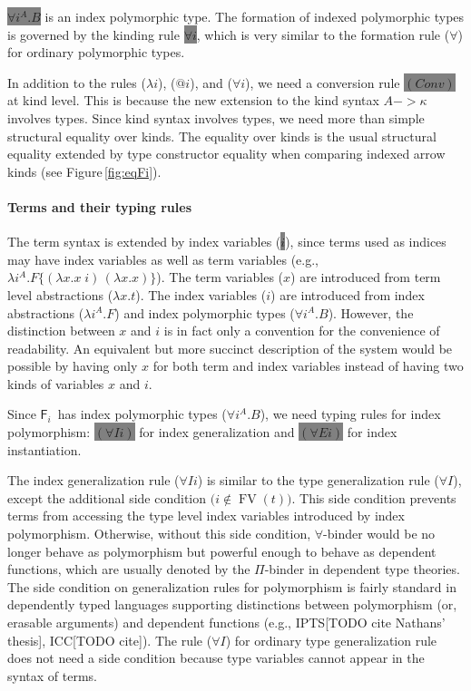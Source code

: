 \documentclass[preprint]{sigplanconf}
\newcommand{\Fig}[1]{Figure\,\ref{fig:#1}}
\newcommand{\newFi}[1]{\colorbox{grey}{\ensuremath{#1}}}
\newcommand{\eg}{{e.g.}}
\newcommand{\Fi}{\ensuremath{\mathsf{F}_i}}
\newcommand{\FV}{\mathop{\mathrm{FV}}}
\theoremstyle{plain}
\theoremstyle{remark}
\theoremstyle{definition}
\begin{document}
\newFi{\forall i^A . B} is an index polymorphic type.
The formation of indexed polymorphic types is governed by
the kinding rule \newFi{\forall i}, which is very similar to
the formation rule ($\forall$) for ordinary polymorphic types.

In addition to the rules ($\lambda i$), ($@ i$), and ($\forall i$),
we need a conversion rule \newFi{(Conv)} at kind level. This is because
the new extension to the kind syntax $A -> \kappa$ involves types.
Since kind syntax involves types, we need more than simple structural
equality over kinds. The equality over kinds is the usual structural equality
extended by type constructor equality when comparing indexed arrow kinds
(see \Fig{eqFi}).

\paragraph{Terms and their typing rules}
The term syntax is extended by index variables (\newFi{i}), since terms used
as indices may have index variables as well as term variables
(\eg, $\lambda i^A.F\{(\lambda x.x\;i)\,(\lambda x.x)\}$).
The term variables ($x$) are introduced from
term level abstractions ($\lambda x.t$).
The index variables ($i$) are introduced from
index abstractions ($\lambda i^A.F$) and
index polymorphic types ($\forall i^A.B$). However, the distinction between
$x$ and $i$ is in fact only a convention for the convenience of readability.
An equivalent but more succinct description of the system would be possible
by having only $x$ for both term and index variables instead of having two
kinds of variables $x$ and $i$.

Since \Fi\ has index polymorphic types ($\forall i^A . B$),
we need typing rules for index polymorphism:
\newFi{(\forall I i)} for index generalization
and \newFi{(\forall E i)} for index instantiation.

The index generalization rule ($\forall I i$) is similar to
the type generalization rule ($\forall I$), except the additional
side condition $\big(i\notin\FV(t)\big)$. This side condition prevents
terms from accessing the type level index variables introduced by index
polymorphism. Otherwise, without this side condition, $\forall$-binder
would be no longer behave as polymorphism but powerful enough to behave as
dependent functions, which are usually denoted by the $\Pi$-binder in
dependent type theories. The side condition on generalization rules
for polymorphism is fairly standard in dependently typed languages supporting
distinctions between polymorphism (or, erasable arguments) and
dependent functions (\eg, IPTS[TODO cite Nathans' thesis], ICC[TODO cite]).
The rule ($\forall I$) for ordinary type generalization rule does not need
a side condition because type variables cannot appear in the syntax of terms.
\end{document}
